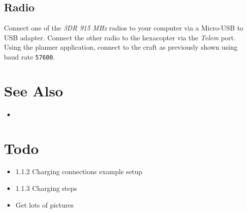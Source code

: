 \documentclass{style}
\begin{document}
\subsection{Radio}
Connect one of the \textit{3DR 915 MHz} radios to your computer via a Micro-USB to USB adapter.
Connect the other radio to the hexacopter via the \textit{Telem} port.  Using the planner application, connect to the craft as previously shown using baud rate \texttt{57600}.
\pagebreak
\section{See Also}
\begin{itemize}
  \item {}
\end{itemize}
\section{Todo}
\begin{itemize}
\item 1.1.2 Charging connections example setup
\item 1.1.3 Charging steps
\item Get lots of pictures
\end{itemize}
\end{document}
